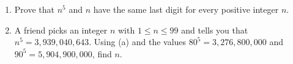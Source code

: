 \begin{enumerate}
\item[(a)] Prove that $n^5$ and $n$ have the same last digit for every positive integer $n$.
\item[(b)] A friend picks an integer $n$ with $1\le n\le99$ and tells you that $n^5=3{,}939{,}040{,}643$. Using (a) and the values $80^5=3{,}276{,}800{,}000$ and $90^5=5{,}904{,}900{,}000$, find $n$.
\end{enumerate}
